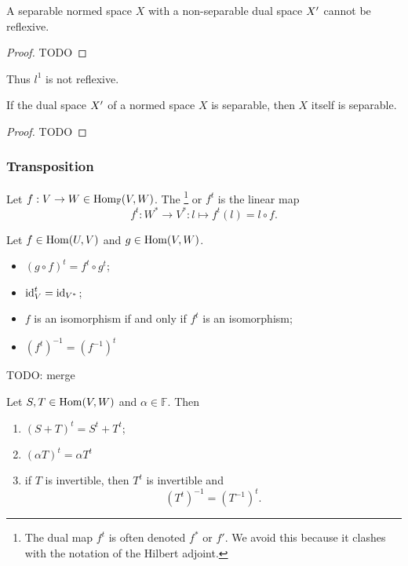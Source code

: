 \begin{proposition}
A separable normed space $X$ with a non-separable dual space ${X}^\prime$ cannot be reflexive. 
\end{proposition}
\begin{proof}
TODO
\end{proof}
Thus $l^1$ is not reflexive.

\begin{proposition}
If the dual space ${X}^\prime$ of a  normed space $X$ is separable, then $X$ itself is separable. 
\end{proposition}
\begin{proof}
TODO
\end{proof}

\subsubsection{Transposition}
\begin{definition}
Let $f:V\to W \in \operatorname{Hom}_{\mathbb{F}}(V,W)$. The \footnote{The dual map $f^t$ is often denoted $f^*$ or $f'$. We avoid this because it clashes with the notation of the Hilbert adjoint.} or  $f^t$ is the linear map
\[ f^t:W^* \to V^*: l\mapsto f^t(l) = l\circ f. \]
\end{definition}
\begin{lemma}
Let $f\in \operatorname{Hom}(U,V)$ and $g\in \operatorname{Hom}(V,W)$.
\begin{itemize}
\item $(g\circ f)^t = f^t\circ g^t$;
\item $\operatorname{id}^t_V = \operatorname{id}_{{V}^*}$;
\item $f$ is an isomorphism \textup{if and only if} $f^t$ is an isomorphism;
\item $(f^t)^{-1} = (f^{-1})^t$ 
\end{itemize}
\end{lemma}
TODO: merge
\begin{lemma}
Let $S,T\in\operatorname{Hom}(V,W)$ and $\alpha\in\mathbb{F}$. Then
\begin{enumerate}
\item $(S+T)^t = S^t+T^t$;
\item $(\alpha T)^t = \alpha T^t$
\item if $T$ is invertible, then $T^t$ is invertible and
\[ (T^t)^{-1} = (T^{-1})^t. \]
\end{enumerate}
\end{lemma}

